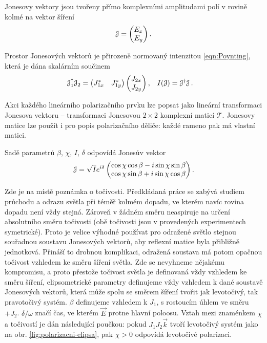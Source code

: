 Jonesovy vektory\cite{azzamEllipsometryPolarizedLight1977} jsou tvořeny přímo komplexními amplitudami polí v rovině kolmé na vektor šíření
\begin{equation}
    \mathcal{J}=\begin{pmatrix} E_{x} \\ E_{y} \end{pmatrix} .
\end{equation}

Prostor Jonesových vektorů je přirozeně normovaný intenzitou \eqref{eqn:Poynting}, kte\-rá je dána skalárním součinem
\begin{align}
    \mathcal{J}_1^\dagger \mathcal{J}_2 &= \begin{pmatrix} J_{1x}^* & J_{1y}^* \end{pmatrix}
    \begin{pmatrix} J_{2x} \\ J_{2y} \end{pmatrix} , 
                      & I(\mathcal{J}) & =\mathcal{J}^\dagger \mathcal{J} \,.
\end{align}

Akci každého lineárního polarizačního prvku lze popsat jako lineární transformaci Jonesova vektoru -- transformaci Jonesovou $2\times 2$ komplexní maticí $\mathcal{T}$.
Jonesovy matice lze použít i pro popis polarizačního děliče: každé rameno pak má vlastní matici.

Sadě parametrů $\beta$, $\chi$, $I$, $\delta$ odpovídá Jonesův vektor
\begin{equation} 
\label{eqn:Jones-elipsa}
    \mathcal{J}=\sqrt{I} e^{i\delta} \begin{pmatrix}
        \cos \chi \cos \beta - i \sin \chi \sin \beta \\
        \cos \chi \sin \beta + i \sin \chi \cos \beta
    \end{pmatrix} .
\end{equation}

Zde je na místě poznámka o točivosti.
Předkládaná práce se zabývá studiem průchodu a odrazu světla při téměř kolmém dopadu, ve kterém navíc rovina dopadu není vždy stejná.
Zároveň v žádném směru neaspiruje na určení absolutního směru točivosti (obě točivosti jsou v provedených experimentech symetrické).
Proto je velice výhodné používat pro odražené světlo stejnou souřadnou soustavu Jonesových vektorů, aby reflexní matice byla přibližně jednotková.
Přináší to drobnou komplikaci, odražená soustava má potom opačnou točivost vzhledem ke směru šíření světla.
Zde se nevyhneme nějakému kompromisu, a proto přestože točivost světla je definovaná vždy vzhledem ke směru šíření, elipsometrické parametry definujeme vždy vzhledem k dané soustavě Jonesových vektorů, která může spolu se směrem šíření tvořit jak levotočivý, tak pravotočivý systém.
$\beta$ definujeme vzhledem k $J_1$, s rostoucím úhlem ve směru $+J_2$.
$\delta/\omega$ značí čas, ve kterém $\vec{E}$ protne hlavní poloosu. 
Vztah mezi znaménkem $\chi$ a točivostí je dán následující poučkou: pokud $J_1 J_2 \vec{k}$ tvoří levotočivý systém jako na obr. \ref{fig:polarizacni-elipsa}, pak $\chi>0$ odpovídá levotočivé polarizaci.

